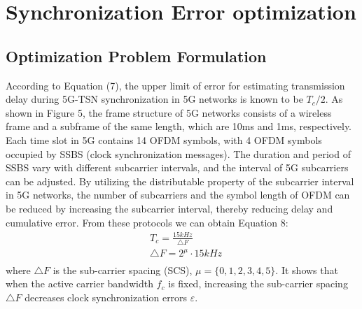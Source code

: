 \documentclass[english]{cccconf}
\begin{document}
\section{Synchronization Error optimization}

\subsection{Optimization Problem Formulation}
According to Equation (7), the upper limit of error for estimating transmission delay during 5G-TSN synchronization in 5G networks is known to be $T_c/2$. As shown in Figure 5, the frame structure of 5G networks consists of a wireless frame and a subframe of the same length, which are 10ms and 1ms, respectively. Each time slot in 5G contains 14 OFDM symbols, with 4 OFDM symbols occupied by SSBS (clock synchronization messages). The duration and period of SSBS vary with different subcarrier intervals, and the interval of 5G subcarriers can be adjusted. By utilizing the distributable property of the subcarrier interval in 5G networks, the number of subcarriers and the symbol length of OFDM can be reduced by increasing the subcarrier interval, thereby reducing delay and cumulative error. From these protocols we can obtain Equation 8:
\begin{equation}
	\begin{split}
		&T_{c}=\frac{15kHz}{\triangle F}\\
		&\triangle F=2^\mu\cdot15kHz \\
	\end{split}	
\end{equation}
where $\triangle F$ is the sub-carrier spacing (SCS), $\mu=\{0,1,2,3,4,5\}$. It shows that when the active carrier bandwidth $f_c$ is fixed, increasing the sub-carrier spacing $\triangle F$ decreases clock synchronization errors $\varepsilon$.
\end{document}
